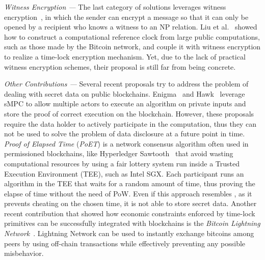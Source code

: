 \smallskip
{\em Witness Encryption ---} The last category of solutions leverages witness encryption~\cite{Garg:2013:WEA:2488608.2488667}, in which the sender can encrypt a message so that it can only be opened by a recipient who knows a witness to an NP relation. Liu et al.~\cite{jager2018} showed how to construct a computational reference clock from large public computations, such as those made by the Bitcoin network, and couple it with witness encryption to realize a time-lock encryption mechanism. Yet, due to the lack of practical witness encryption schemes, their proposal is still far from being concrete.

\smallskip
{\em Other Contributions ---}
Several recent proposals try to address the problem of dealing with secret data on public blockchains. Enigma~\cite{enigma} and Hawk~\cite{hawk} leverage sMPC to allow multiple actors to execute an algorithm on private inputs and store the proof of correct execution on the blockchain.
However, these proposals require the data holder to actively participate in the computation, thus they can not be used to solve the problem of data disclosure at a future point in time.
%
{\em Proof of Elapsed Time} ({\em PoET}) is a network consensus algorithm often used in permissioned blockchains, like Hyperledger Sawtooth~\cite{poet,hyperledger-sawtooth} that avoid wasting computational resources by using a fair lottery system run inside a Trusted Execution Environment (TEE), such as Intel SGX. Each participant runs an algorithm in the TEE that waits for a random amount of time, thus proving the elapse of time without the need of PoW. Even if this approach resembles \shortname, as it prevents cheating on the chosen time, it is not able to store secret data.
%
Another recent contribution that showed how economic constraints enforced by time-lock primitives can be successfully integrated with blockchains is the {\em Bitcoin Lightning Network}~\cite{poon2016bitcoin}. Lightning Network can be used to instantly exchange bitcoins among peers by using off-chain transactions while effectively preventing any possible misbehavior.